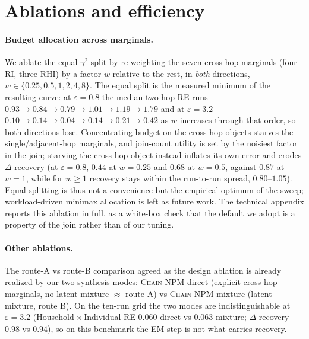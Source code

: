 \documentclass[sigconf, nonacm]{acmart}
\newcommand{\chainnpm}{\textsc{Chain-NPM}\xspace}
\begin{document}
\section{Ablations and efficiency}
\label{app:ablations}

\paragraph{Budget allocation across marginals.}
\label{sec:abl-alloc}
We ablate the equal $\gamma^2$-split by re-weighting the seven
cross-hop marginals (four RI, three RHI) by a factor $w$ relative to the
rest, in \emph{both} directions, $w\in\{0.25,0.5,1,2,4,8\}$. The equal split
is the measured minimum of the resulting curve: at $\varepsilon{=}0.8$ the
median two-hop RE runs $0.93 \to 0.84 \to \mathbf{0.79} \to 1.01 \to 1.19 \to
1.79$ and at $\varepsilon{=}3.2$ $0.10 \to 0.14 \to \mathbf{0.04} \to 0.14
\to 0.21 \to 0.42$ as $w$ increases through that order, so both directions
lose. Concentrating budget on the cross-hop objects starves the
single/adjacent-hop marginals, and join-count utility is set by the noisiest
factor in the join; starving the cross-hop object instead inflates its own
error and erodes $\Delta$-recovery (at $\varepsilon{=}0.8$, $0.44$ at
$w{=}0.25$ and $0.68$ at
$w{=}0.5$, against $0.87$ at $w{=}1$, while for $w\ge1$ recovery stays within
the run-to-run spread, $0.80$--$1.05$). Equal splitting is thus not a
convenience but the empirical optimum of the sweep; workload-driven minimax
allocation is left as future work.
The technical appendix reports this ablation in full, as a
white-box check that the default we adopt is a property of the join rather
than of our tuning.

\paragraph{Other ablations.}
The route-A vs route-B comparison agreed as the design ablation is already
realized by our two synthesis modes: \chainnpm-direct (explicit cross-hop
marginals, no latent mixture $\approx$ route A) vs \chainnpm-mixture
(latent mixture, route B). On the ten-run grid the two modes are indistinguishable at
$\varepsilon{=}3.2$ (Household$\Join$Individual RE $0.060$ direct vs $0.063$
mixture; $\Delta$-recovery $0.98$ vs $0.94$), so on this benchmark the EM
step is not what carries recovery.
\end{document}
